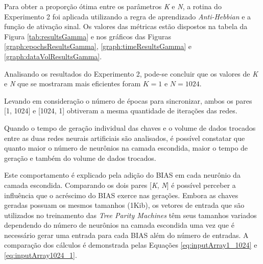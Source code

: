 \documentclass[a4paper,10pt,oneside,conference,final,keeplastbox]{inatel}
\begin{document}
                Para obter a proporção ótima entre os parâmetros \textit{K} e \textit{N}, a rotina do Experimento 2 foi aplicada utilizando a regra de aprendizado \textit{Anti-Hebbian} e a função de ativação sinal. Os valores das métricas estão dispostos na tabela da Figura \ref{tab:resultsGamma} e nos gráficos das Figuras \ref{graph:epochsResultsGamma}, \ref{graph:timeResultsGamma} e \ref{graph:dataVolResultsGamma}.
                
                
                
                
                
                
                
                

                Analisando os resultados do Experimento 2, pode-se concluir que os valores de \textit{K} e \textit{N} que se mostraram mais eficientes foram $K = 1$ e $N = 1024$.
                
                Levando em consideração o número de épocas para sincronizar, ambos os pares [1, 1024] e [1024, 1] obtiveram a mesma quantidade de iterações das redes.
                
                Quando o tempo de geração individual das chaves e o volume de dados trocados entre as duas redes neurais artificiais são analisados, é possível constatar que quanto maior o número de neurônios na camada escondida, maior o tempo de geração e também do volume de dados trocados.
                
                Este comportamento é explicado pela adição do BIAS em cada neurônio da camada escondida. Comparando os dois pares [\textit{K}, \textit{N}] é possível perceber a influência que o acréscimo do BIAS exerce nas gerações. Embora as chaves geradas possuam os mesmos tamanhos (1Kib), os vetores de entrada que são utilizados no treinamento das \textit{Tree Parity Machines} têm seus tamanhos variados dependendo do número de neurônios na camada escondida uma vez que é necessário gerar uma entrada para cada BIAS além do número de entradas. A comparação dos cálculos é demonstrada pelas Equações \eqref{eq:inputArray1_1024} e \eqref{eq:inputArray1024_1}.
                
\end{document}
